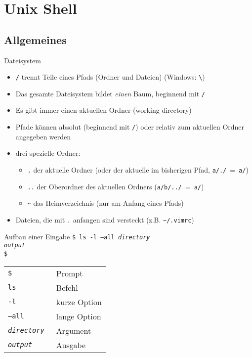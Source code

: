 \section{Unix Shell}
  \subsection{Allgemeines}
    \begin{frame}{Dateisystem}
      \begin{itemize}
        \item \texttt{/} trennt Teile eines Pfads (Ordner und Dateien) (Windows: \texttt{\textbackslash})
        \item Das gesamte Dateisystem bildet \emph{einen} Baum, beginnend mit \texttt{/}
        \item Es gibt immer einen aktuellen Ordner (working directory)
        \item Pfade können absolut (beginnend mit \texttt{/}) oder relativ zum aktuellen Ordner angegeben werden
        \item drei spezielle Ordner:
          \begin{itemize}
            \item \texttt{.} der aktuelle Ordner (oder der aktuelle im bisherigen Pfad, \texttt{a/./}~=~\texttt{a/})
            \item \texttt{..} der Oberordner des aktuellen Ordners (\texttt{a/b/../}~=~\texttt{a/})
            \item \texttt{\textasciitilde} das Heimverzeichnis (nur am Anfang eines Pfads)
          \end{itemize}
        \item Dateien, die mit \texttt{.} anfangen sind versteckt (z.B. \texttt{\textasciitilde/.vimrc})
      \end{itemize}
    \end{frame}

    \begin{frame}{Aufbau einer Eingabe}
      \texttt{\$ ls -l --all \textit{directory}\\
              \textit{output}\\
              \$}
      \begin{center}
        \begin{tabular}{>{\tt}l l}
          \toprule
          \$                 & Prompt       \\
          ls                 & Befehl       \\
          -l                 & kurze Option \\
          --all              & lange Option \\
          \textit{directory} & Argument     \\
          \textit{output}    & Ausgabe      \\
          \bottomrule
        \end{tabular}
      \end{center}
    \end{frame}

